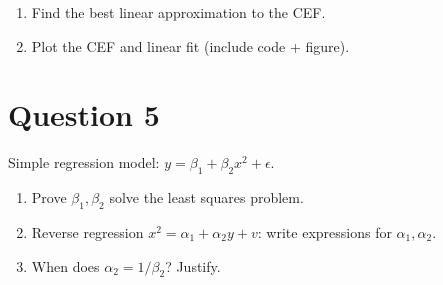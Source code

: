 \documentclass[12pt,a4paper]{article}
\begin{document}
\begin{enumerate}[label=(\alph*)]
  \item Find the best linear approximation to the CEF.  
  \item Plot the CEF and linear fit (include code + figure).
\end{enumerate}

\section*{Question 5}
Simple regression model: $y = \beta_1 + \beta_2 x^2 + \epsilon$.

\begin{enumerate}[label=(\alph*)]
  \item Prove $\beta_1,\beta_2$ solve the least squares problem.  
  \item Reverse regression $x^2 = \alpha_1 + \alpha_2 y + v$: write expressions for $\alpha_1,\alpha_2$.  
  \item When does $\alpha_2 = 1/\beta_2$? Justify.
\end{enumerate}
\end{document}
